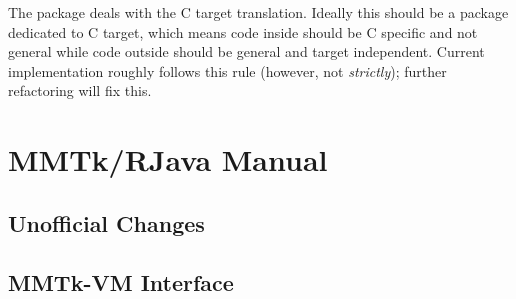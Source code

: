 \documentclass[12pt]{article}
\begin{document}
The  package deals with 
the C target translation. Ideally this should be a package 
dedicated to C target, which means code inside should be C specific 
and not general while code outside should be general and 
target independent. 
Current implementation roughly follows this rule 
(however, not \emph{strictly}); further refactoring will fix this. 

\section{MMTk/RJava Manual}

\subsection{Unofficial Changes}
\subsection{MMTk-VM Interface}
\end{document}
